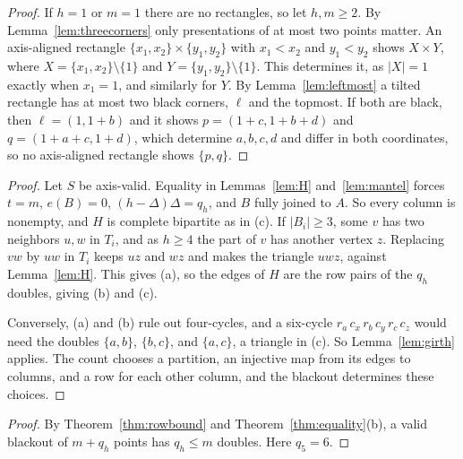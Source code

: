 \begin{proof}
If $h=1$ or $m=1$ there are no rectangles, so let $h,m\ge2$. By Lemma~\ref{lem:threecorners} only presentations of at most two points matter. An axis-aligned rectangle $\{x_1,x_2\}\times\{y_1,y_2\}$ with $x_1<x_2$ and $y_1<y_2$ shows $X\times Y$, where $X=\{x_1,x_2\}\setminus\{1\}$ and $Y=\{y_1,y_2\}\setminus\{1\}$. This determines it, as $|X|=1$ exactly when $x_1=1$, and similarly for $Y$. By Lemma~\ref{lem:leftmost} a tilted rectangle has at most two black corners, $\ell$ and the topmost. If both are black, then $\ell=(1,1+b)$ and it shows $p=(1+c,1+b+d)$ and $q=(1+a+c,1+d)$, which determine $a,b,c,d$ and differ in both coordinates, so no axis-aligned rectangle shows $\{p,q\}$.
\end{proof}

\begin{proof}
Let $S$ be axis-valid. Equality in Lemmas~\ref{lem:H} and~\ref{lem:mantel} forces $t=m$, $e(B)=0$, $(h-\Delta)\Delta=q_h$, and $B$ fully joined to $A$. So every column is nonempty, and $H$ is complete bipartite as in (c). If $|B_i|\ge3$, some $v$ has two neighbors $u,w$ in $T_i$, and as $h\ge4$ the part of $v$ has another vertex $z$. Replacing $vw$ by $uw$ in $T_i$ keeps $uz$ and $wz$ and makes the triangle $uwz$, against Lemma~\ref{lem:H}. This gives (a), so the edges of $H$ are the row pairs of the $q_h$ doubles, giving (b) and (c).

Conversely, (a) and (b) rule out four-cycles, and a six-cycle $r_a\,c_x\,r_b\,c_y\,r_c\,c_z$ would need the doubles $\{a,b\}$, $\{b,c\}$, and $\{a,c\}$, a triangle in (c). So Lemma~\ref{lem:girth} applies. The count chooses a partition, an injective map from its edges to columns, and a row for each other column, and the blackout determines these choices.
\end{proof}

\begin{proof}
By Theorem~\ref{thm:rowbound} and Theorem~\ref{thm:equality}(b), a valid blackout of $m+q_h$ points has $q_h\le m$ doubles. Here $q_5=6$.
\end{proof}
